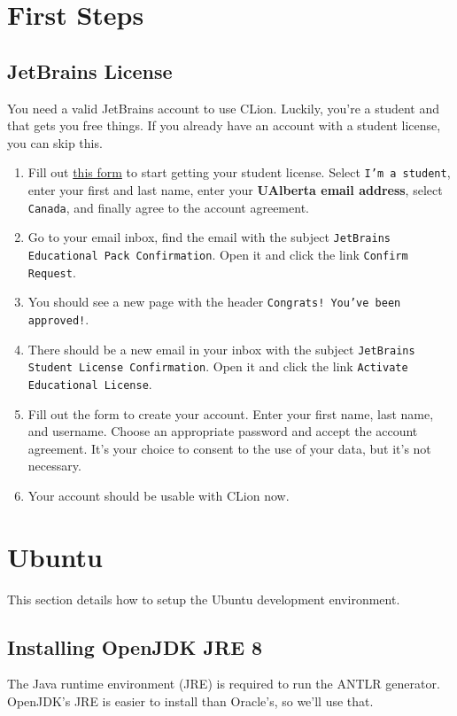 \documentclass{article}
\begin{document}
\section{First Steps}
\subsection{JetBrains License}
You need a valid JetBrains account to use CLion. Luckily, you're a student and that gets you
free things. If you already have an account with a student license, you can skip this.
\begin{enumerate}
  \item
    Fill out \href{https://www.jetbrains.com/shop/eform/students} {this form} to start getting
    your student license. Select \texttt{I'm a student}, enter your first and last name, enter
    your \textbf{UAlberta email address}, select \texttt{Canada}, and finally agree to the
    account agreement.
  \item
    Go to your email inbox, find the email with the subject \texttt{JetBrains Educational Pack
    Confirmation}. Open it and click the link \texttt{Confirm Request}.
  \item
    You should see a new page with the header \texttt{Congrats! You've been approved!}.
  \item
    There should be a new email in your inbox with the subject \texttt{JetBrains Student License
    Confirmation}. Open it and click the link \texttt{Activate Educational License}.
  \item
    Fill out the form to create your account. Enter your first name, last name, and username.
    Choose an appropriate password and accept the account agreement. It's your choice to
    consent to the use of your data, but it's not necessary.
  \item
    Your account should be usable with CLion now.
\end{enumerate}

\section{Ubuntu}
This section details how to setup the Ubuntu development environment.

\subsection{Installing OpenJDK JRE 8}
The Java runtime environment (JRE) is required to run the ANTLR generator. OpenJDK's JRE is easier
to install than Oracle's, so we'll use that.
\end{document}
